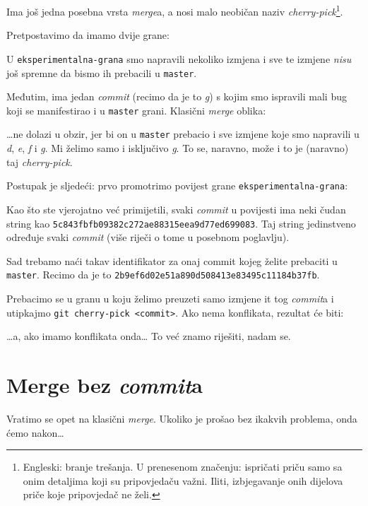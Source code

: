 Ima još jedna posebna vrsta \emph{merge}a, a nosi malo neobičan naziv \emph{cherry-pick}\footnote{Engleski: branje trešanja. U prenesenom značenju: ispričati priču samo sa onim detaljima koji su pripovjedaču važni. Iliti, izbjegavanje onih dijelova priče koje pripovjedač ne želi.}.

Pretpostavimo da imamo dvije grane:



U \verb+eksperimentalna-grana+ smo napravili nekoliko izmjena i sve te izmjene \emph{nisu} još spremne da bismo ih prebacili u \verb+master+.

Međutim, ima jedan \emph{commit} (recimo da je to \emph g) s kojim smo ispravili mali bug koji se manifestirao i u \verb+master+ grani.
Klasični \emph{merge} oblika:



\dots{}ne dolazi u obzir, jer bi on u \verb+master+ prebacio i sve izmjene koje smo napravili u \emph d, \emph e, \emph f i \emph g.
Mi želimo samo i isključivo \emph g.
To se, naravno, može i to je (naravno) taj \emph{cherry-pick}.

Postupak je sljedeći: prvo promotrimo povijest grane \verb+eksperimentalna-grana+:



Kao što ste vjerojatno već primijetili, svaki \emph{commit} u povijesti ima neki čudan string kao \verb+5c843fbfb09382c272ae88315eea9d77ed699083+.
Taj string jedinstveno određuje svaki \emph{commit} (više riječi o tome u posebnom poglavlju).

Sad trebamo naći takav identifikator za onaj commit kojeg želite prebaciti u \verb+master+. Recimo da je to \verb+2b9ef6d02e51a890d508413e83495c11184b37fb+.

Prebacimo se u granu u koju želimo preuzeti samo izmjene it tog \emph{commit}a i utipkajmo \verb+git cherry-pick <commit>+.
Ako nema konflikata, rezultat će biti:



\dots{}a, ako imamo konflikata onda\dots 
To već znamo riješiti, nadam se.

\section*{Merge bez \emph{commit}a}

Vratimo se opet na klasični \emph{merge}.
Ukoliko je prošao bez ikakvih problema, onda ćemo nakon\dots

